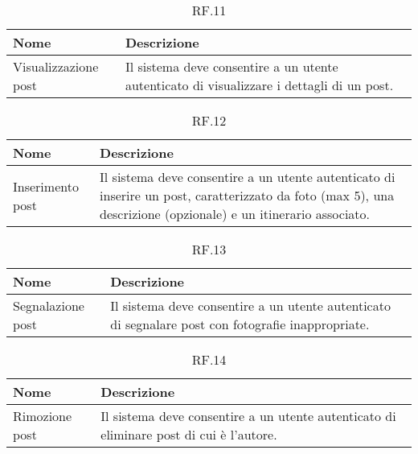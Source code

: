 \documentclass{natourDoc}
\begin{document}
	\begin{table}[H]
		\centering
		\begin{tabular}{ |p{5cm}|p{10.3cm}| }
			\hline
			\rowcolor{PineGreen!70}
			\textbf{Nome} & \textbf{Descrizione} \\
			\hline
			Visualizzazione post & Il sistema deve consentire a un utente autenticato di visualizzare
			i dettagli di un post. \\
			\hline
		\end{tabular}
		\caption{RF.11}
		\label{table:11}
	\end{table}

	\begin{table}[H]
		\centering
		\begin{tabular}{ |p{5cm}|p{10.3cm}| } 
			\hline
			\rowcolor{PineGreen!70}
			\textbf{Nome} & \textbf{Descrizione} \\
			\hline
			Inserimento post &  Il sistema deve consentire a un utente autenticato di inserire un post, 
			caratterizzato da foto (max 5), una descrizione (opzionale) e un itinerario associato. \\
			\hline
		\end{tabular}
		\caption{RF.12}
		\label{table:12}
	\end{table}
	
	
	\begin{table}[H]
		\centering
		\begin{tabular}{ |p{5cm}|p{10.3cm}| }
			\hline
			\rowcolor{PineGreen!70}
			\textbf{Nome} & \textbf{Descrizione} \\
			\hline
			Segnalazione post & Il sistema deve consentire a un utente autenticato di segnalare post con fotografie
			inappropriate. \\
			\hline
		\end{tabular}
		\caption{RF.13}
		\label{table:13}
	\end{table}

	\begin{table}[H]
		\centering
		\begin{tabular}{ |p{5cm}|p{10.3cm}| }
			\hline
			\rowcolor{PineGreen!70}
			\textbf{Nome} & \textbf{Descrizione} \\
			\hline
			Rimozione post & Il sistema deve consentire a un utente autenticato di eliminare post di cui
			è l'autore. \\
			\hline
		\end{tabular}
		\caption{RF.14}
		\label{table:14}
	\end{table}
\end{document}
